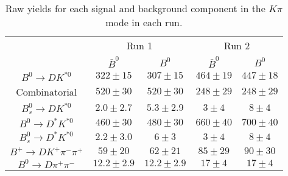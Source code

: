 \begin{table}
  \centering
  \begin{tabular}{ccccc}
      \toprule
       & \multicolumn{2}{c}{Run 1} & \multicolumn{2}{c}{Run 2} \\
      & $\bar{B}^0$ & $B^0$& $\bar{B}^0$ & $B^0$ \\
      \midrule
      $B^0 \to DK^{*0}$ & $322 \pm 15$ & $307 \pm 15$ & $464 \pm 19$ & $447 \pm 18$ \\
      Combinatorial & $520 \pm 30$ & $520 \pm 30$ & $248 \pm 29$ & $248 \pm 29$ \\
      $B^0_s \to DK^{*0}$ & $2.0 \pm 2.7$ & $5.3 \pm 2.9$ & $3 \pm 4$ & $8 \pm 4$ \\
      $B^0 \to D^*K^{*0}$ & $460 \pm 30$ & $480 \pm 30$ & $660 \pm 40$ & $700 \pm 40$ \\
      $B^0_s \to D^*K^{*0}$ & $2.2 \pm 3.0$ & $6 \pm 3$ & $3 \pm 4$ & $8 \pm 4$ \\
      $B^+ \to DK^+\pi^-\pi^+$ & $59 \pm 20$ & $62 \pm 21$ & $85 \pm 29$ & $90 \pm 30$ \\
      $B^0 \to D\pi^+\pi^-$ & $12.2 \pm 2.9$ & $12.2 \pm 2.9$ & $17 \pm 4$ & $17 \pm 4$ \\
      \bottomrule
      \end{tabular}
\caption{Raw yields for each signal and background component in the $K\pi$ mode in each run.}
\label{tab:yields_Kpi}
\end{table}
